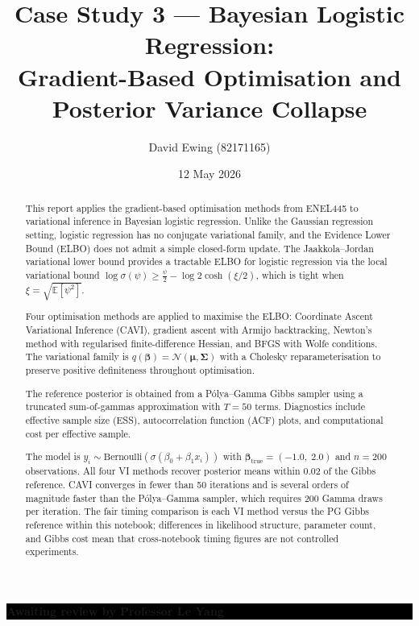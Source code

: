 \documentclass[11pt,a4paper]{article}
\title{
Case Study 3 --- Bayesian Logistic Regression:\\[0.4em]
Gradient-Based Optimisation and Posterior Variance Collapse
}
\author{
  David Ewing (82171165)
}
\date{12 May 2026}
\newcommand{\E}{\mathbb{E}}
\newcommand{\N}{\mathcal{N}}
\begin{document}
\maketitle

\begin{abstract}
\setlength{\parindent}{0pt}
\setlength{\parskip}{0.7em}

This report applies the gradient-based optimisation methods from ENEL445 to variational
inference in Bayesian logistic regression.
Unlike the Gaussian regression setting, logistic regression has no conjugate variational
family, and the Evidence Lower Bound (ELBO) does not admit a simple closed-form update.
The Jaakkola--Jordan \parencite{Jaakkola2000} variational lower bound provides a tractable
ELBO for logistic regression via the local variational bound $\log\sigma(\psi) \geq
\tfrac{\psi}{2} - \log 2\cosh(\xi/2)$, which is tight when $\xi = \sqrt{\E[\psi^2]}$.

Four optimisation methods are applied to maximise the ELBO:
Coordinate Ascent Variational Inference (CAVI), gradient ascent with Armijo backtracking,
Newton's method with regularised finite-difference Hessian, and BFGS with Wolfe conditions.
The variational family is $q(\bm{\beta}) = \N(\bm{\mu},\bm{\Sigma})$ with a
Cholesky reparameterisation to preserve positive definiteness throughout optimisation.

The reference posterior is obtained from a P\'{o}lya--Gamma Gibbs sampler
\parencite{Polson2013} using a truncated sum-of-gammas approximation with $T=50$ terms.
Diagnostics include effective sample size (ESS), autocorrelation function (ACF) plots,
and computational cost per effective sample.

The model is $y_i \sim \mathrm{Bernoulli}(\sigma(\beta_0 + \beta_1 x_i))$
with $\bm{\beta}_{\mathrm{true}} = (-1.0,\; 2.0)$ and $n=200$ observations.
All four VI methods recover posterior means within $0.02$ of the Gibbs reference.
CAVI converges in fewer than 50 iterations and is several orders of magnitude faster
than the P\'{o}lya--Gamma sampler, which requires $200$ Gamma draws per iteration.
The fair timing comparison is each VI method versus the PG Gibbs reference within
this notebook; differences in likelihood structure, parameter count, and Gibbs cost
mean that cross-notebook timing figures are not controlled experiments.
\end{abstract}

\vspace{2em}

\noindent\colorbox{black}{%
  \parbox{\dimexpr\linewidth-2\fboxsep}{%
    \centering
    \vspace{8pt}
    {\color{white}\large\bfseries Awaiting review by Professor Le Yang}%
    \vspace{8pt}
  }%
}
\end{document}
